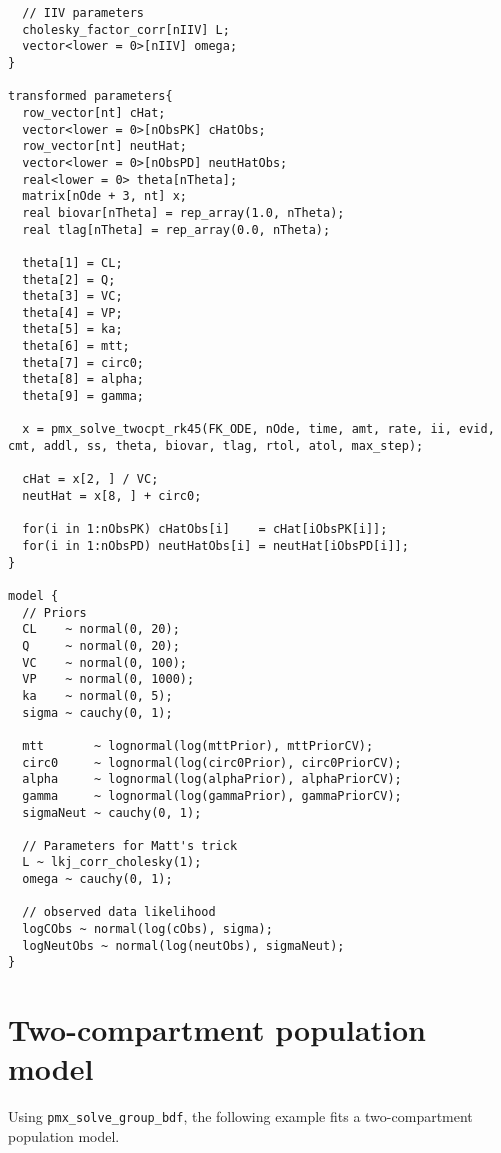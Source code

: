 \documentclass[12pt, reqno, oneside]{amsbook}
\numberwithin{equation}{chapter}
\numberwithin{figure}{chapter}
\numberwithin{table}{chapter}
\theoremstyle{remark}
\begin{document}
\begin{verbatim}
  // IIV parameters
  cholesky_factor_corr[nIIV] L;
  vector<lower = 0>[nIIV] omega;
}

transformed parameters{
  row_vector[nt] cHat;
  vector<lower = 0>[nObsPK] cHatObs;
  row_vector[nt] neutHat;
  vector<lower = 0>[nObsPD] neutHatObs;
  real<lower = 0> theta[nTheta];
  matrix[nOde + 3, nt] x;
  real biovar[nTheta] = rep_array(1.0, nTheta);
  real tlag[nTheta] = rep_array(0.0, nTheta);

  theta[1] = CL;
  theta[2] = Q;
  theta[3] = VC;
  theta[4] = VP;
  theta[5] = ka;
  theta[6] = mtt;
  theta[7] = circ0;
  theta[8] = alpha;
  theta[9] = gamma;

  x = pmx_solve_twocpt_rk45(FK_ODE, nOde, time, amt, rate, ii, evid, cmt, addl, ss, theta, biovar, tlag, rtol, atol, max_step);

  cHat = x[2, ] / VC;
  neutHat = x[8, ] + circ0;

  for(i in 1:nObsPK) cHatObs[i]    = cHat[iObsPK[i]];
  for(i in 1:nObsPD) neutHatObs[i] = neutHat[iObsPD[i]];
}

model {
  // Priors
  CL    ~ normal(0, 20);
  Q     ~ normal(0, 20);
  VC    ~ normal(0, 100);
  VP    ~ normal(0, 1000);
  ka    ~ normal(0, 5);
  sigma ~ cauchy(0, 1);

  mtt       ~ lognormal(log(mttPrior), mttPriorCV);
  circ0     ~ lognormal(log(circ0Prior), circ0PriorCV);
  alpha     ~ lognormal(log(alphaPrior), alphaPriorCV);
  gamma     ~ lognormal(log(gammaPrior), gammaPriorCV);
  sigmaNeut ~ cauchy(0, 1);

  // Parameters for Matt's trick
  L ~ lkj_corr_cholesky(1);
  omega ~ cauchy(0, 1);

  // observed data likelihood
  logCObs ~ normal(log(cObs), sigma);
  logNeutObs ~ normal(log(neutObs), sigmaNeut);
}
\end{verbatim}

\section{Two-compartment population model}
\label{sec:orgbace525}
Using \texttt{pmx\_solve\_group\_bdf}, the following example fits a
two-compartment population model.
\end{document}
